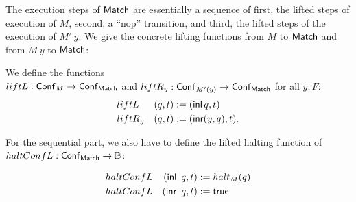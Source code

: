The execution steps of $\mathsf{Match}$ are essentially a sequence of first, the lifted steps of execution of $M$, second, a ``nop'' transition, and third,
the lifted steps of the execution of $M'~y$.  We give the concrete lifting functions from $M$ to $\mathsf{Match}$ and from $M~y$ to $\mathsf{Match}$:
%
\begin{definition}
  We define the functions \\$liftL : \mathsf{Conf}_M \rightarrow \mathsf{Conf}_{\mathsf{Match}}$ and $liftR_y : \mathsf{Conf}_{M'(y)} \rightarrow \mathsf{Conf}_{\mathsf{Match}}$ for all $y:F$:
  \begin{alignat*}{2}
    & liftL   & (q, t) &:= (\operatorname{\mathsf{inl}} q,      t) \\
    & liftR_y & (q, t) &:= (\operatorname{\mathsf{inr}} (y, q), t).
  \end{alignat*}
\end{definition}

For the sequential part, we also have to define the lifted halting function of \\$haltConfL : \mathsf{Conf}_{\mathsf{Match}} \rightarrow \mathbb{B}$:
\begin{definition}
  \begin{alignat*}{2}
    & haltConfL & (\operatorname{\mathsf{inl}}~q, t) &:= halt_M(q) \\
    & haltConfL & (\operatorname{\mathsf{inr}}~q, t) &:= \mathsf{true}
  \end{alignat*}
\end{definition}

